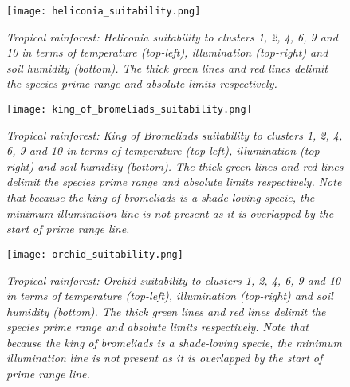 \begin{figure}
\center
	\texttt{[image: heliconia\_suitability.png]}
	\caption{\textit{Tropical rainforest: Heliconia suitability to clusters 1, 2, 4, 6, 9 and 10 in terms of temperature (top-left), illumination (top-right) and soil humidity (bottom). The thick green lines and red lines delimit the species prime range and absolute limits respectively.}}
	\label{fig:results_tropical_heliconia_suitability}
\end{figure}

\begin{figure}
\center
	\texttt{[image: king\_of\_bromeliads\_suitability.png]}
	\caption{ \textit{Tropical rainforest: King of Bromeliads suitability to clusters 1, 2, 4, 6, 9 and 10 in terms of temperature (top-left), illumination (top-right) and soil humidity (bottom). The thick green lines and red lines delimit the species prime range and absolute limits respectively. Note that because the king of bromeliads is a shade-loving specie, the minimum illumination line is not present as it is overlapped by the start of prime range line.}}
	\label{fig:results_tropical_king_of_bromeliads_suitability}
\end{figure}

\begin{figure}
\center
	\texttt{[image: orchid\_suitability.png]}
	\caption{ \textit{Tropical rainforest: Orchid suitability to clusters 1, 2, 4, 6, 9 and 10 in terms of temperature (top-left), illumination (top-right) and soil humidity (bottom). The thick green lines and red lines delimit the species prime range and absolute limits respectively. Note that because the king of bromeliads is a shade-loving specie, the minimum illumination line is not present as it is overlapped by the start of prime range line.}}
	\label{fig:results_tropical_orchid_suitability}
\end{figure}

